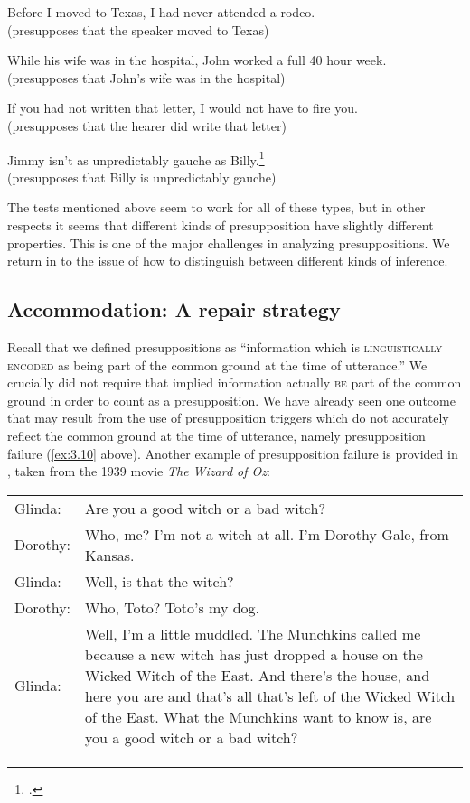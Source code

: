 \ea \label{ex:3.14}
\ea Before I moved to Texas, I had never attended a rodeo.\\
  (presupposes that the speaker moved to Texas)

  \ex While his wife was in the hospital, John worked a full 40 hour week.\\
  (presupposes that John’s wife was in the hospital)

   \ex If you had not written that letter, I would not have to fire you.\\
  (presupposes that the hearer did write that letter) 

  \ex Jimmy isn’t as unpredictably gauche as Billy.\footnote{\citet[183]{Levinson1983}.}\\
  (presupposes that Billy is unpredictably gauche)
                       \z
                       \z


The tests mentioned above seem to work for all of these types, but in other respects it seems that different kinds of presupposition have slightly different properties. This is one of the major challenges in analyzing presuppositions. We return in  to the issue of how to distinguish between different kinds of inference.


\subsection{Accommodation: A repair strategy}\label{sec:3.4.2}

Recall that we defined presuppositions as “information which is \textsc{linguistically encoded} as being part of the common ground at the time of utterance.” We crucially did not require that implied information actually \textsc{be} part of the common ground in order to count as a presupposition. We have already seen one outcome that may result from the use of presupposition triggers which do not accurately reflect the common ground at the time of utterance, namely presupposition failure (\ref{ex:3.10} above). Another example of presupposition failure is provided in , taken from the 1939 movie \textit{The Wizard of Oz}:

\ea \label{ex:3.15}\begin{tabular}[t]{@{}lp{9.25cm}@{}} 
Glinda: & Are you a good witch or a bad witch?\\
Dorothy: & Who, me?  I’m not a witch at all.  I’m Dorothy Gale, from Kansas.\\
Glinda: & Well, is that the witch?\\
Dorothy: & Who, Toto?  Toto’s my dog.\\
Glinda: & Well, I’m a little muddled. The Munchkins called me because a new witch has just dropped a house on the Wicked Witch of the East. And there’s the house, and here you are and that’s all that’s left of the Wicked Witch of the East. What the Munchkins want to know is, are you a good witch or a bad witch?
\end{tabular}
\z


